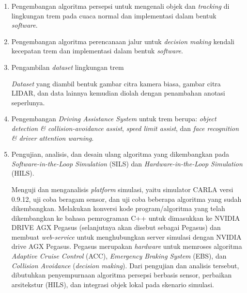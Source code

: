 \begin{enumerate}

    \item Pengembangan algoritma persepsi untuk mengenali objek dan
    \textit{tracking} di lingkungan trem pada cuaca normal dan implementasi
    dalam bentuk \textit{software}.


    \item Pengembangan algoritma perencanaan jalur untuk \textit{decision
    making} kendali kecepatan trem dan implementasi dalam bentuk
    \textit{software}.


    \item Pengambilan \textit{dataset} lingkungan trem

    \textit{Dataset} yang diambil bentuk gambar citra kamera biasa, gambar citra
    LIDAR, dan data lainnya kemudian diolah dengan penambahan anotasi
    seperlunya.

    \item Pengembangan \textit{Driving Assistance System} untuk trem berupa:
    \textit{object detection \& collision-avoidance assist}, \textit{speed limit
    assist}, dan \textit{face recognition \& driver attention warning}.

    \item Pengujian, analisis, dan desain ulang algoritma yang dikembangkan pada
    \textit{Software-in-the-Loop Simulation} (SILS) dan
    \textit{Hardware-in-the-Loop Simulation} (HILS).

    Menguji dan menganalisis \textit{platform} simulasi, yaitu simulator CARLA
    versi 0.9.12, uji coba beragam sensor, dan uji coba beberapa algoritma yang
    sudah dikembangkan. Melakukan konversi kode program/algoritma yang telah
    dikembangkan ke bahasa pemrograman C++ untuk dimasukkan ke NVIDIA DRIVE AGX
    Pegasus (selanjutnya akan disebut sebagai Pegasus) dan membuat
    \textit{web-service} untuk menghubungkan server simulasi dengan NVIDIA drive
    AGX Pegasus. Pegasus merupakan \textit{hardware} untuk memroses
    algoritma \textit{Adaptive Cruise Control} (ACC), \textit{Emergency Braking
    System} (EBS), dan \textit{Collision Avoidance} (\textit{decision making}).
    Dari pengujian dan analisis tersebut, dibutuhkan penyempurnaan algoritma
    persepsi berbasis sensor, perbaikan arsitekstur (HILS), dan integrasi objek
    lokal pada skenario simulasi.


\end{enumerate}
